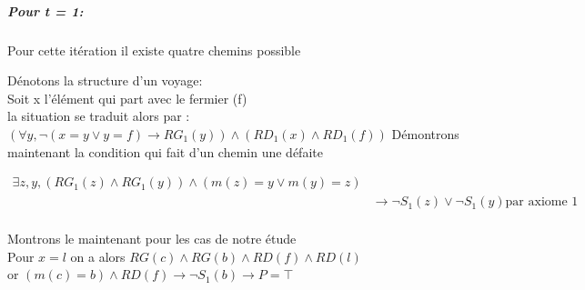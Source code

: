 \documentclass{article}
\begin{document}
\subparagraph*{Pour t = 1:}

Pour cette itération il existe quatre chemins possible

Dénotons la structure d'un voyage:\\
Soit x l'élément qui part avec le fermier (f)\\
la situation se traduit alors par :\\
$(\forall y , \neg(x = y \vee y = f) \rightarrow RG_1(y)) \wedge (RD_1(x) \wedge RD_1(f))$
Démontrons maintenant la condition qui fait d'un chemin une défaite

\begin{align*}
    \exists z,y, (RG_1(z) \wedge RG_1(y)) \wedge (m(z) =y \vee m(y) =z)\\
    &\rightarrow \neg S_1(z) \vee \neg S_1(y)\text{par axiome 1}\\
    &
\end{align*}

Montrons le maintenant pour les cas de notre étude\\
Pour $x=l$
on a alors $RG(c)\wedge RG(b) \wedge RD(f) \wedge RD(l)$\\
or $(m(c)=b) \wedge RD(f) \rightarrow \neg S_1(b) \rightarrow P = \top$
\end{document}
